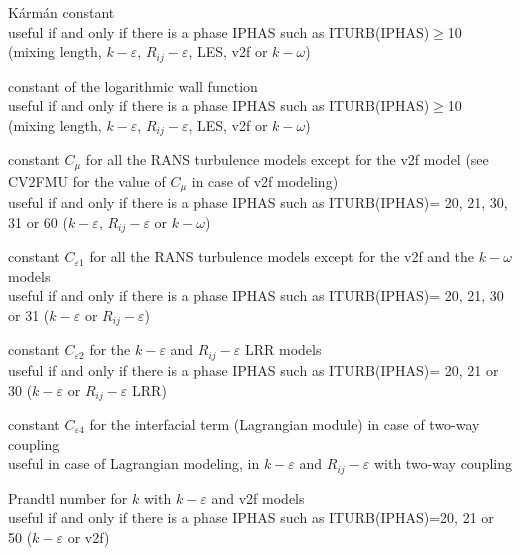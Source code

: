 {K\'arm\'an constant\\
useful if and only if there is a phase IPHAS such as ITURB(IPHAS)$\geqslant$10
(mixing length, $k-\varepsilon$, $R_{ij}-\varepsilon$, LES, v2f or $k-\omega$)}

{constant of the logarithmic wall function\\
useful if and only if there is a phase IPHAS such as ITURB(IPHAS)$\geqslant$10
(mixing length, $k-\varepsilon$, $R_{ij}-\varepsilon$, LES, v2f or $k-\omega$)}

{constant $C_\mu$ for all the RANS turbulence models except for the v2f model
(see CV2FMU for the value of $C_\mu$ in case of v2f modeling)\\
useful if and only if there is a phase IPHAS such as ITURB(IPHAS)= 20,
21, 30, 31 or 60 ($k-\varepsilon$, $R_{ij}-\varepsilon$ or $k-\omega$)}

{constant $C_{\varepsilon 1}$ for all the RANS turbulence models except
for the v2f and the $k-\omega$ models\\
useful if and only if there is a phase IPHAS such as ITURB(IPHAS)= 20,
21, 30 or 31 ($k-\varepsilon$ or $R_{ij}-\varepsilon$)}

{constant $C_{\varepsilon 2}$ for the $k-\varepsilon$ and
$R_{ij}-\varepsilon$ LRR models\\
useful if and only if there is a phase IPHAS such as ITURB(IPHAS)= 20, 21 or 30
($k-\varepsilon$ or $R_{ij}-\varepsilon$ LRR)}


{constant $C_{\varepsilon 4}$ for the interfacial term (Lagrangian module) in
case of two-way coupling\\
useful in case of Lagrangian modeling, in $k-\varepsilon$ and $R_{ij}-\varepsilon$
with two-way coupling}

{Prandtl number for $k$ with $k-\varepsilon$ and v2f models\\
useful if and only if there is a phase IPHAS such as ITURB(IPHAS)=20, 21 or 50
($k-\varepsilon$ or v2f)}

